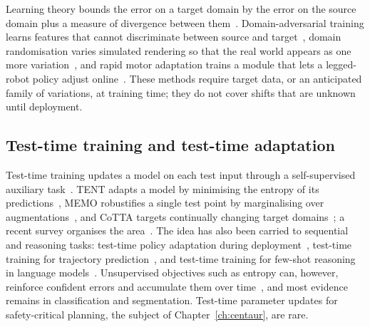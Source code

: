 Learning theory bounds the error on a target domain by the error on the source domain plus a measure of divergence between them~\cite{bendavid2010theory}. Domain-adversarial training learns features that cannot discriminate between source and target~\cite{ganin2016dann}, domain randomisation varies simulated rendering so that the real world appears as one more variation~\cite{tobin2017domain}, and rapid motor adaptation trains a module that lets a legged-robot policy adjust online~\cite{kumar2021rma}. These methods require target data, or an anticipated family of variations, at training time; they do not cover shifts that are unknown until deployment.

\subsection{Test-time training and test-time adaptation}

Test-time training updates a model on each test input through a self-supervised auxiliary task~\cite{sun2020ttt}. TENT adapts a model by minimising the entropy of its predictions~\cite{wang2021tent}, MEMO robustifies a single test point by marginalising over augmentations~\cite{zhang2022memo}, and CoTTA targets continually changing target domains~\cite{wang2022cotta}; a recent survey organises the area~\cite{liang2025ttasurvey}. The idea has also been carried to sequential and reasoning tasks: test-time policy adaptation during deployment~\cite{hansen2021pad}, test-time training for trajectory prediction~\cite{park2024t4p}, and test-time training for few-shot reasoning in language models~\cite{akyurek2025ttt}. Unsupervised objectives such as entropy can, however, reinforce confident errors and accumulate them over time~\cite{wang2022cotta}, and most evidence remains in classification and segmentation. Test-time parameter updates for safety-critical planning, the subject of Chapter~\ref{ch:centaur}, are rare.

